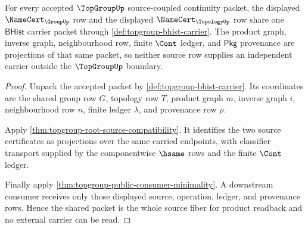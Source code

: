\begin{theorem}
\label{thm:topgroup-source-fiber-product-carrier}
For every accepted $\TopGroupUp$ source-coupled continuity packet, the displayed
$\NameCert_{\GroupUp}$ row and the displayed $\NameCert_{\TopologyUp}$ row share
one $\mathsf{BHist}$ carrier packet through
\autoref{def:topgroup-bhist-carrier}. The product graph, inverse graph,
neighbourhood row, finite $\Cont$ ledger, and $\mathsf{Pkg}$ provenance are
projections of that same packet, so neither source row supplies an independent
carrier outside the $\TopGroupUp$ boundary.
\end{theorem}
\begin{proof}
Unpack the accepted packet by \autoref{def:topgroup-bhist-carrier}. Its
coordinates are the shared group row $G$, topology row $T$, product graph $m$,
inverse graph $i$, neighbourhood row $n$, finite ledger $\lambda$, and
provenance row $\rho$.

Apply \autoref{thm:topgroup-root-source-compatibility}. It identifies the two
source certificates as projections over the same carried endpoints, with
classifier transport supplied by the componentwise $\hsame$ rows and the finite
$\Cont$ ledger.

Finally apply \autoref{thm:topgroup-public-consumer-minimality}. A downstream
consumer receives only those displayed source, operation, ledger, and provenance
rows. Hence the shared packet is the whole source fiber for product readback and
no external carrier can be read.
\end{proof}

